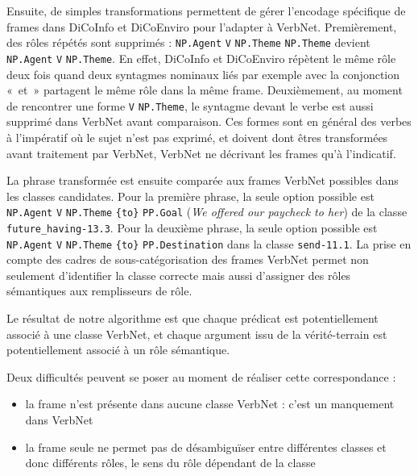 Ensuite, de simples transformations permettent de gérer l'encodage spécifique
de frames dans DiCoInfo et DiCoEnviro pour l'adapter à VerbNet. Premièrement,
des rôles répétés sont supprimés : \texttt{NP.Agent} \texttt{V}
\texttt{NP.Theme} \texttt{NP.Theme} devient \texttt{NP.Agent} \texttt{V}
\texttt{NP.Theme}. En effet, DiCoInfo et DiCoEnviro répètent le même rôle deux
fois quand deux syntagmes nominaux liés par exemple avec la conjonction «~et~»
partagent le même rôle dans la même frame. Deuxièmement, au moment de
rencontrer une forme \texttt{V} \texttt{NP.Theme}, le syntagme devant le verbe
est aussi supprimé dans VerbNet avant comparaison. Ces formes sont en général
des verbes à l'impératif où le sujet n'est pas exprimé, et doivent dont êtres
transformées avant traitement par VerbNet, VerbNet ne décrivant les frames qu'à
l'indicatif.

La phrase transformée est ensuite comparée aux frames VerbNet possibles dans
les classes candidates. Pour la première phrase, la seule option possible est
\texttt{NP.Agent} \texttt{V} \texttt{NP.Theme} \texttt{\{to\}} \texttt{PP.Goal}
(\textit{We offered our paycheck to her}) de la classe
\texttt{future\_having-13.3}. Pour la deuxième phrase, la seule option possible
est \texttt{NP.Agent} \texttt{V} \texttt{NP.Theme} \texttt{\{to\}}
\texttt{PP.Destination} dans la classe \texttt{send-11.1}. La prise en compte
des cadres de sous-catégorisation des frames VerbNet permet non seulement
d'identifier la classe correcte mais aussi d'assigner des rôles sémantiques aux
remplisseurs de rôle.

Le résultat de notre algorithme est que chaque prédicat est potentiellement
associé à une classe VerbNet, et chaque argument issu de la vérité-terrain est
potentiellement associé à un rôle sémantique.

Deux difficultés peuvent se poser au moment de réaliser cette correspondance :
\begin{itemize}

    \item la frame n'est présente dans aucune classe VerbNet : c'est un
        manquement dans VerbNet

    \item la frame seule ne permet pas de désambiguïser entre différentes
        classes et donc différents rôles, le sens du rôle dépendant de la
        classe

\end{itemize}
        

